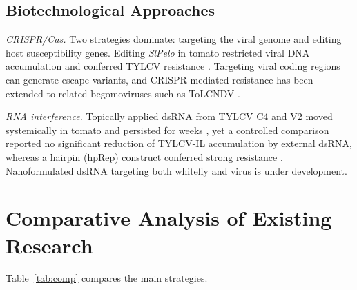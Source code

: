 \documentclass[journal]{IEEEtran}
\begin{document}
\subsection{Biotechnological Approaches}
\textit{CRISPR/Cas.} Two strategies dominate: targeting the viral genome and editing host susceptibility genes. Editing \textit{SlPelo} in tomato restricted viral DNA accumulation and conferred TYLCV resistance \cite{pramanik2021}. Targeting viral coding regions can generate escape variants, and CRISPR-mediated resistance has been extended to related begomoviruses such as ToLCNDV \cite{tolcndv2025}.

\textit{RNA interference.} Topically applied dsRNA from TYLCV C4 and V2 moved systemically in tomato and persisted for weeks \cite{tabein2022}, yet a controlled comparison reported no significant reduction of TYLCV-IL accumulation by external dsRNA, whereas a hairpin (hpRep) construct conferred strong resistance \cite{dsrna2021}. Nanoformulated dsRNA targeting both whitefly and virus is under development.

\section{Comparative Analysis of Existing Research}
Table~\ref{tab:comp} compares the main strategies.
\end{document}
